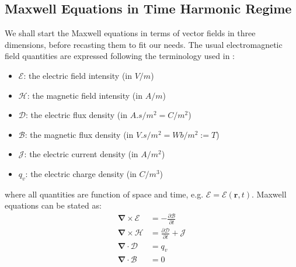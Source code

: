 \subsection{Maxwell Equations in Time Harmonic Regime}
We shall start the Maxwell equations in terms of vector fields in three dimensions, before recasting them to fit our needs. The usual electromagnetic field quantities are expressed following the terminology used in :
\begin{itemize}
	\item $\boldsymbol{\mathcal{E}}$: the electric field intensity (in $\si{V/m}$)
	\item $\boldsymbol{\mathcal{H}}$: the magnetic field intensity (in $\si{A/m}$)
	\item $\boldsymbol{\mathcal{D}}$: the electric flux density (in $\si{A.s/m^2=C/m^2}$)
	\item $\boldsymbol{\mathcal{B}}$: the magnetic flux density (in $\si{V.s/m^2} = \si{Wb/m^2} := \si{T}$)
	\item $\boldsymbol{\mathcal{J}}$: the electric current density (in $\si{A/m^2}$)
	\item $q_v$: the electric charge density (in $\si{C/m^3}$)
\end{itemize}
where all quantities are function of space and time, e.g. $\boldsymbol{\mathcal{E}}=\boldsymbol{\mathcal{E}}(\mathbf{r},t)$. Maxwell equations can be stated as:
\begin{subequations}
	\begin{align}
		\boldsymbol{\nabla} \times \boldsymbol{\mathcal{E}} &= -\frac{\partial \boldsymbol{\mathcal{B}}}{\partial t} \label{eq:Maxwell-Faraday}\\
		\boldsymbol{\nabla} \times \boldsymbol{\mathcal{H}} &= \frac{\partial \boldsymbol{\mathcal{D}}}{\partial t} + \boldsymbol{\mathcal{J}} \label{eq:Maxwell-Ampere} \\
		\boldsymbol{\nabla} \cdot \boldsymbol{\mathcal{D}} &= q_v \label{eq:Maxwell-Gauss} \\
		\boldsymbol{\nabla} \cdot \boldsymbol{\mathcal{B}} &= 0 \label{eq:Maxwell-Gauss-Magnetism}
	\end{align}
	\label{eq:MaxwellEquations}
\end{subequations} 


